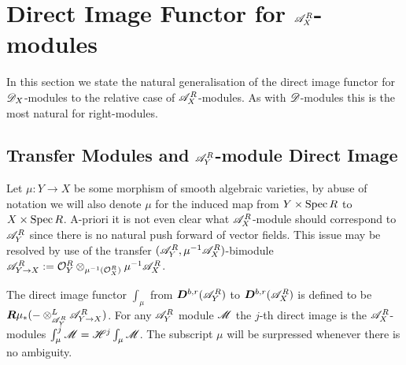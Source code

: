 \section{Direct Image Functor for $\mathscr{A}_X^R$-modules}
    In this section we state the natural generalisation of the direct image functor for $\mathscr{D}_X$-modules to the relative case of $\mathscr{A}_X^R$-modules. As with $\mathscr{D}$-modules this is the most natural for right-modules.

    \subsection{Transfer Modules and $\mathscr{A}_Y^R$-module Direct Image}
    Let $\mu:Y\to X$ be some morphism of smooth algebraic varieties, by abuse of notation we will also denote $\mu$ for the induced map from $Y\times \operatorname{Spec} R$ to $X\times \operatorname{Spec} R$.  A-priori it is not even clear what $\mathscr{A}_X^R$-module should correspond to $\mathscr{A}_Y^R$ since there is no natural push forward of vector fields. This issue may be resolved by use of the transfer $(\mathscr{A}_Y^R,\mu^{-1}\mathscr{A}_X^R)$-bimodule $\mathscr{A}_{Y\to X}^R:= \mathcal{O}_Y^R \otimes_{\mu^{-1}(\mathcal{O}_X^R)}\mu^{-1}\mathscr{A}_X^R$.

    \begin{definition}
      The direct image functor $\int_\mu$ from $\boldsymbol{D}^{b,r}(\mathscr{A}_Y^R)$ to $\boldsymbol{D}^{b,r}(\mathscr{A}_X^R)$ is defined to be $\boldsymbol{R}\mu_* ({-}\otimes_{\mathscr{A}_Y^R}^L \mathscr{A}_{Y\to X}^R)$.
      For any $\mathscr{A}_Y^R$ module $\mathscr{M}$ the $j$-th direct image is the $\mathscr{A}_X^R$-modules $\int_\mu^j \mathscr{M} = \mathscr{H}^j \int_\mu \mathscr{M}$.
      The subscript $\mu$ will be surpressed whenever there is no ambiguity.
    \end{definition}

